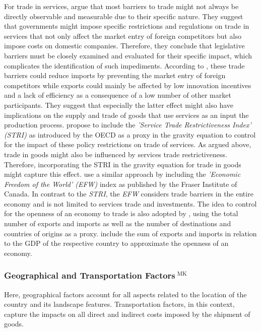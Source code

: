 For trade in services, \textcite{Nordas2017} argue that most barriers to trade might not always be directly observable and measurable due to their specific nature. They suggest that governments might impose specific restrictions and regulations on trade in services that not only affect the market entry of foreign competitors but also impose costs on domestic companies. Therefore, they conclude that legislative barriers must be closely examined and evaluated for their specific impact, which complicates the identification of such impediments. According to \textcite{Nordas2017}, these trade barriers could reduce imports by preventing the market entry of foreign competitors while exports could mainly be affected by low innovation incentives and a lack of efficiency as a consequence of a low number of other market participants. They suggest that especially the latter effect might also have implications on the supply and trade of goods that use services as an input the production process. \textcite{Nordas2017} propose to include the \textit{'Service Trade Restrictiveness Index' (STRI)} as introduced by the OECD as a proxy in the gravity equation to control for the impact of these policy restrictions on trade of services. As argued above, trade in goods might also be influenced by services trade restrictiveness. Therefore, incorporating the STRI in the gravity equation for trade in goods might capture this effect. \textcite{Kimura2006} use a similar approach by including the \textit{'Economic Freedom of the World' (EFW)} index as published by the Fraser Institute of Canada. In contrast to the \textit{STRI}, the \textit{EFW} considers trade barriers in the entire economy and is not limited to services trade and investments. The idea to control for the openness of an economy to trade is also adopted by \textcite{Brau2013}, using the total number of exports and imports as well as the number of destinations and countries of origins as a proxy. \textcite{Tadesse2010} include the sum of exports and imports in relation to the GDP of the respective country to approximate the openness of an economy. 

\subsubsection[Geographical and Transportation Factors]{Geographical and Transportation Factors$^{\text{ MK}}$}
\label{sec:geo}

Here, geographical factors account for all aspects related to the location of the country and its landscape features. Transportation factors, in this context, capture the impacts on all direct and indirect costs imposed by the shipment of goods. 

